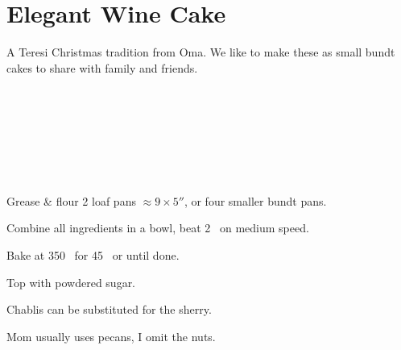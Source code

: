 \section{Elegant Wine Cake}


\begin{recipestats}[
	servings=2 loafs,
	preptime=10 \minute,
	bakingtime=45 \minute,
	source=Lucille Steinmiller (Oma),
	]
\end{recipestats}


\begin{recipeabstract}
	A Teresi Christmas tradition from Oma.
	We like to make these as small bundt cakes to share with family and friends.
\end{recipeabstract}


\begin{ingredientcolumns}[1]
	\begin{ingredientblock}
		\\
		\\
		\\
		\\
		\\
		\\
	\end{ingredientblock}
\end{ingredientcolumns}


\begin{preparation}
\item Grease \& flour 2 loaf pans $\approx 9 \times 5''$, or four smaller bundt pans.

\item Combine all ingredients in a bowl, beat 2 \minute~on medium speed.

\item Bake at 350 \Fahrenheit~for 45 \minute~or until done.

\item Top with powdered sugar.
\end{preparation}

\begin{variation}
\item Chablis can be substituted for the sherry.

\item Mom usually uses pecans, I  omit the nuts.
\end{variation}


\recipeend%
